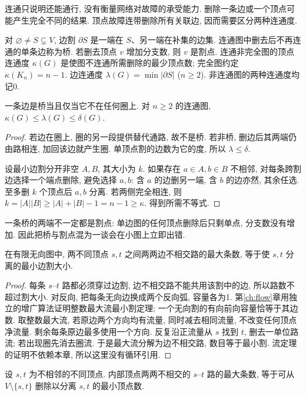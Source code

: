 \label{ch:connectivity}
连通只说明还能通行, 没有衡量网络对故障的承受能力. 删除一条边或一个顶点可能产生完全不同的结果. 顶点故障连带删除所有关联边, 因而需要区分两种连通度.
\begin{definition}
对 $\varnothing\ne S\subsetneq V$, 边割 $\partial S$ 是一端在 $S$、另一端在补集的边集. 连通图中删去后不再连通的单条边称为桥. 若删去顶点 $v$ 增加分支数, 则 $v$ 是割点. 连通非完全图的顶点连通度 $\kappa(G)$ 是使图不连通所需删除的最少顶点数; 完全图约定 $\kappa(K_n)=n-1$. 边连通度 $\lambda(G)=\min|\partial S|$ ($n\ge2$). 非连通图的两种连通度均记0.
\end{definition}
\begin{proposition}
一条边是桥当且仅当它不在任何圈上. 对 $n\ge2$ 的连通图, $\kappa(G)\le\lambda(G)\le\delta(G)$.
\end{proposition}
\begin{proof}
若边在圈上, 圈的另一段提供替代通路, 故不是桥. 若非桥, 删边后其两端仍由路相连, 加回该边就产生圈. 单顶点割的边数为它的度, 所以 $\lambda\le\delta$.

设最小边割分开非空 $A,B$, 其大小为 $k$. 如果存在 $a\in A,b\in B$ 不相邻, 对每条跨割边选择一个端点删除, 避免选择 $a,b$: 含 $a$ 的边删另一端, 含 $b$ 的边亦然, 其余任选. 至多删 $k$ 个顶点后 $a,b$ 分离. 若两侧完全相连, 则 $k=|A||B|\ge |A|+|B|-1=n-1\ge\kappa$. 得到所需不等式.
\end{proof}
一条桥的两端不一定都是割点: 单边图的任何顶点删除后只剩单点, 分支数没有增加. 因此把桥与割点混为一谈会在小图上立即出错.
\begin{theorem}\label{thm:mengeredge}
在有限无向图中, 两不同顶点 $s,t$ 之间两两边不相交路的最大条数, 等于使 $s,t$ 分离的最小边割大小.
\end{theorem}
\begin{proof}
每条 $s$--$t$ 路都必须穿过边割, 边不相交路不能共用该割中的边, 所以路数不超过割大小. 对反向, 把每条无向边换成两个反向弧, 容量各为1. 第\ref{ch:flow}章用独立的增广算法证明整数最大流最小割定理; 一个无向割的有向前向容量恰等于其边数. 取整数最大流, 若原边两个方向均有流量, 同时减去相同流量, 不改变任何顶点净流量. 剩余每条原边最多使用一个方向. 反复沿正流量从 $s$ 找到 $t$, 删去一单位路流; 若出现圈先消去圈流. 于是最大流分解为边不相交路, 数目等于最小割. 流定理的证明不依赖本章, 所以这里没有循环引用.
\end{proof}
\begin{theorem}\label{thm:mengervertex}
设 $s,t$ 为不相邻的不同顶点. 内部顶点两两不相交的 $s$--$t$ 路的最大条数, 等于可从 $V\setminus\{s,t\}$ 删除以分离 $s,t$ 的最小顶点数.
\end{theorem}
